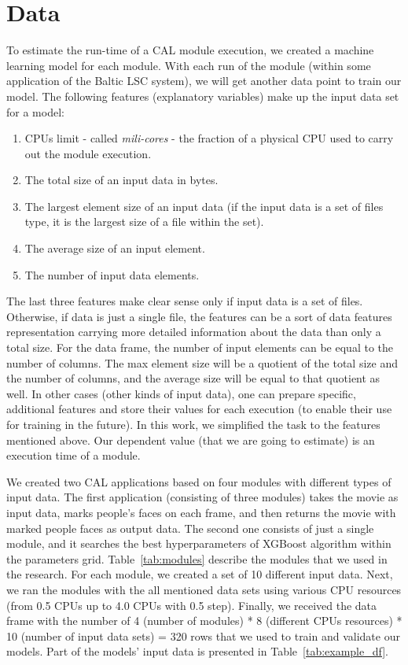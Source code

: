 \section{Data}

To estimate the run-time of a CAL module execution, we created a machine learning model for each module. With each run of the module (within some application of the Baltic LSC system), we will get another data point to train our model. The following features (explanatory variables)  make up the input data set for a model:

\begin{enumerate}
	\item CPUs limit - called \textit{mili-cores} - the fraction of a physical CPU used to carry out the module execution.
	\item The total size of an input data in bytes.
	\item The largest element size of an input data (if the input data is a set of files type, it is the largest size of a file within the set).
	\item The average size of an input element.
	\item The number of input data elements.
\end{enumerate}

The last three features make clear sense only if input data is a set of files. Otherwise, if data is just a single file, the features can be a sort of data features representation carrying more detailed information about the data than only a total size. For the data frame, the number of input elements can be equal to the number of columns. The max element size will be a quotient of the total size and the number of columns, and the average size will be equal to that quotient as well.  In other cases (other kinds of input data), one can prepare specific, additional features and store their values for each execution (to enable their use for training in the future).  In this work, we simplified the task to the features mentioned above. Our dependent value (that we are going to estimate) is an execution time of a module. 

We created two CAL applications based on four modules with different types of input data. The first application (consisting of three modules) takes the movie as input data, marks people's faces on each frame, and then returns the movie with marked people faces as output data. The second one consists of just a single module, and it searches the best hyperparameters of XGBoost algorithm within the parameters grid. Table~\ref{tab:modules} describe the modules that we used in the research. For each module, we created a set of 10 different input data. Next, we ran the modules with the all mentioned data sets using various CPU resources (from 0.5 CPUs up to 4.0 CPUs with 0.5 step). Finally, we received the data frame with the number of 4 (number of modules) * 8 (different CPUs resources) * 10 (number of input data sets) = 320 rows that we used to train and validate our models. Part of the models' input data is presented in Table~\ref{tab:example_df}. 

